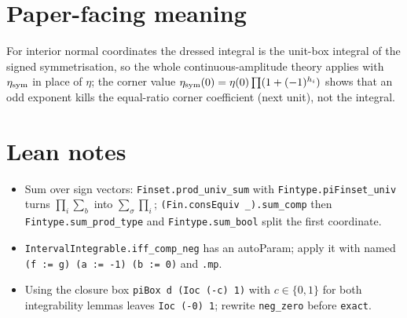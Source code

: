 \documentclass[11pt]{article}
\begin{document}
\section{Paper-facing meaning}
For interior normal coordinates the dressed integral is the unit-box integral of the signed
symmetrisation, so the whole continuous-amplitude theory applies with $\eta_{\rm sym}$ in place of
$\eta$; the corner value $\eta_{\rm sym}(0)=\eta(0)\prod(1+(-1)^{h_i})$ shows that an odd exponent kills
the equal-ratio corner coefficient (next unit), not the integral.

\section{Lean notes}
\begin{itemize}
\item Sum over sign vectors: \texttt{Finset.prod\_univ\_sum} with \texttt{Fintype.piFinset\_univ} turns
$\prod_i\sum_b$ into $\sum_\sigma\prod_i$; \texttt{(Fin.consEquiv \_).sum\_comp} then
\texttt{Fintype.sum\_prod\_type} and \texttt{Fintype.sum\_bool} split the first coordinate.
\item \texttt{IntervalIntegrable.iff\_comp\_neg} has an autoParam; apply it with named
\texttt{(f := g) (a := -1) (b := 0)} and \texttt{.mp}.
\item Using the closure box \texttt{piBox d (Ioc (-c) 1)} with $c\in\{0,1\}$ for both integrability
lemmas leaves \texttt{Ioc (-0) 1}; rewrite \texttt{neg\_zero} before \texttt{exact}.
\end{itemize}
\end{document}
